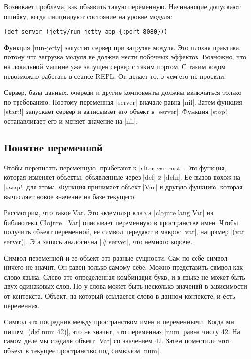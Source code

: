 Возникает проблема, как объявить такую переменную. Начинающие допускают ошибку,
когда инициируют состояние на уровне модуля:

\begin{verbatim}
(def server (jetty/run-jetty app {:port 8080}))
\end{verbatim}

Функция \spverb|run-jetty| запустит сервер при загрузке модуля. Это плохая практика,
потому что загрузка модуля не должна нести побочных эффектов. Возможно, что на
локальной машине уже запущен сервер с таким портом. С таким кодом невозможно
работать в сеансе REPL. Он делает то, о чем его не просили.

Сервер, базы данных, очереди и другие компоненты должны включаться только по
требованию. Поэтому переменная \spverb|server| вначале равна \spverb|nil|. Затем функция
\spverb|start!| запускает сервер и записывает его объект в \spverb|server|. Функция \spverb|stop!|
останавливает его и меняет значение на \spverb|nil|.

\subsection{Понятие переменной}

Чтобы переписать переменную, прибегают к \spverb|alter-var-root|. Это функция, которая
изменяет объекты, объявленные через \spverb|def| и \spverb|defn|. Ее вызов похож на \spverb|swap!|
для атома. Функция принимает объект \spverb|Var| и другую функцию, которая вычисляет
новое значение на базе текущего.

Рассмотрим, что такое Var. Это экземпляр класса \spverb|clojure.lang.Var| из библиотеки
Clojure. \spverb|Var| описывает переменную в пространстве имен. Чтобы получить объект
переменной, ее символ передают в макрос \spverb|var|, например \spverb|(var server)|. Эта
запись аналогична \spverb|#'server|, что немного короче.

Символ переменной и ее объект это разные сущности. Сам по себе символ ничего не
значит. Он равен только самому себе. Можно представить символ как слово
языка. Слово это определенная комбинация букв, и в языке не может быть двух
одинаковых слов. Но у слова может быть несколько значений в зависимости от
контекста. Объект, на который ссылается слово в данном контексте, и есть
переменная.

Символ это посредник между пространством имен и переменными. Когда мы пишем
\spverb|(def num 42)|, это не значит, что переменная \spverb|num| равна числу 42. На самом
деле мы создали объект \spverb|Var| со значением 42. Затем поместили этот объект в
текущее пространство под символом \spverb|num|.

